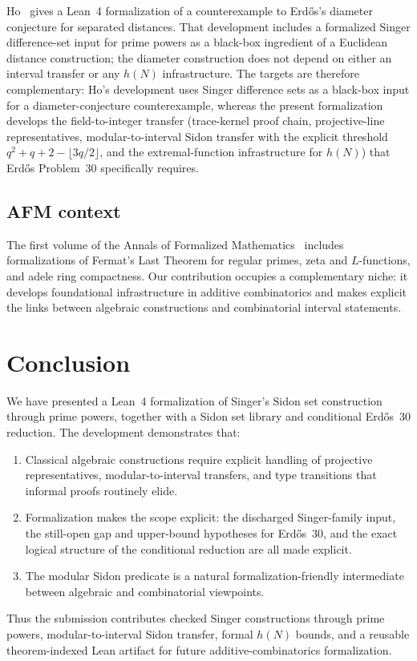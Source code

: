 \documentclass[11pt,a4paper]{article}
\begin{document}
Ho~\cite{Ho2026} gives a Lean~4 formalization of a counterexample to
Erd\H{o}s's diameter conjecture for separated distances.  That development
includes a formalized Singer difference-set input for prime powers as a
black-box ingredient of a Euclidean distance construction; the diameter
construction does not depend on either an interval transfer or any
\(h(N)\) infrastructure.  The targets are therefore complementary: Ho's
development uses Singer difference sets as a black-box input for a
diameter-conjecture counterexample, whereas the present formalization develops
the field-to-integer transfer (trace-kernel proof chain, projective-line
representatives, modular-to-interval Sidon transfer with the explicit threshold
\(q^2+q+2-\lfloor3q/2\rfloor\), and the extremal-function infrastructure for
\(h(N)\)) that Erd\H{o}s Problem~30 specifically requires.

\subsection{AFM context}

The first volume of the Annals of Formalized Mathematics~\cite{Brasca2025,%
Loeffler2025,Mercuri2025} includes formalizations of Fermat's Last Theorem for
regular primes, zeta and $L$-functions, and adele ring compactness.  Our
contribution occupies a complementary niche: it develops foundational
infrastructure in additive combinatorics and makes explicit the links between
algebraic constructions and combinatorial interval statements.

\section{Conclusion}
\label{sec:conclusion}

We have presented a Lean~4 formalization of Singer's Sidon set construction
through prime powers, together with a Sidon set library and conditional
Erd\H{o}s~30 reduction.  The development demonstrates that:
\begin{enumerate}[nosep]
  \item Classical algebraic constructions require explicit handling of
    projective representatives, modular-to-interval transfers, and type
    transitions that informal proofs routinely elide.
  \item Formalization makes the scope explicit: the discharged Singer-family
    input, the still-open gap and upper-bound hypotheses for Erd\H{o}s~30, and
    the exact logical structure of the conditional reduction are all made
    explicit.
  \item The modular Sidon predicate is a natural formalization-friendly
    intermediate between algebraic and combinatorial viewpoints.
\end{enumerate}
Thus the submission contributes checked Singer constructions through prime powers,
modular-to-interval Sidon transfer, formal \(h(N)\) bounds, and a reusable
theorem-indexed Lean artifact for future additive-combinatorics formalization.
\end{document}
